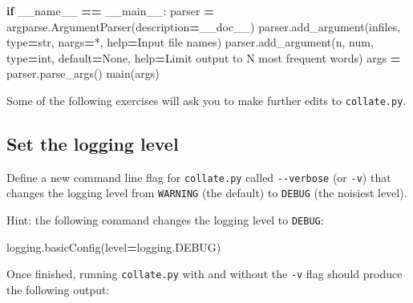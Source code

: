\documentclass[
]{krantz}
\makeatletter
\newenvironment{Shaded}{\begin{snugshade}}{\end{snugshade}}
\newcommand{\BuiltInTok}[1]{#1}
\newcommand{\ControlFlowTok}[1]{\textcolor[rgb]{0.13,0.29,0.53}{\textbf{#1}}}
\newcommand{\NormalTok}[1]{#1}
\newcommand{\OperatorTok}[1]{\textcolor[rgb]{0.81,0.36,0.00}{\textbf{#1}}}
\newcommand{\StringTok}[1]{\textcolor[rgb]{0.31,0.60,0.02}{#1}}
\newcommand{\VariableTok}[1]{\textcolor[rgb]{0.00,0.00,0.00}{#1}}
\newenvironment{kframe}{%
\medskip{}
\setlength{\fboxsep}{.8em}
 \def\at@end@of@kframe{}%
 \ifinner\ifhmode%
  \def\at@end@of@kframe{\end{minipage}}%
  \begin{minipage}{\columnwidth}%
 \fi\fi%
 \def\FrameCommand##1{\hskip\@totalleftmargin \hskip-\fboxsep
 \colorbox{shadecolor}{##1}\hskip-\fboxsep
     \hskip-\linewidth \hskip-\@totalleftmargin \hskip\columnwidth}%
 \MakeFramed {\advance\hsize-\width
   \@totalleftmargin\z@ \linewidth\hsize
   \@setminipage}}%
 {\par\unskip\endMakeFramed%
 \at@end@of@kframe}
\renewenvironment{Shaded}{\begin{kframe}}{\end{kframe}}
\makeatother
\begin{document}
\begin{Shaded}
\begin{Highlighting}[]
\ControlFlowTok{if} \VariableTok{\_\_name\_\_} \OperatorTok{==} \StringTok{\textquotesingle{}\_\_main\_\_\textquotesingle{}}\NormalTok{:}
\NormalTok{    parser }\OperatorTok{=}\NormalTok{ argparse.ArgumentParser(description}\OperatorTok{=}\NormalTok{\_\_doc\_\_)}
\NormalTok{    parser.add\_argument(}\StringTok{\textquotesingle{}infiles\textquotesingle{}}\NormalTok{, }\BuiltInTok{type}\OperatorTok{=}\BuiltInTok{str}\NormalTok{, nargs}\OperatorTok{=}\StringTok{\textquotesingle{}*\textquotesingle{}}\NormalTok{, }\BuiltInTok{help}\OperatorTok{=}\StringTok{\textquotesingle{}Input file names\textquotesingle{}}\NormalTok{)}
\NormalTok{    parser.add\_argument(}\StringTok{\textquotesingle{}{-}n\textquotesingle{}}\NormalTok{, }\StringTok{\textquotesingle{}{-}{-}num\textquotesingle{}}\NormalTok{, }\BuiltInTok{type}\OperatorTok{=}\BuiltInTok{int}\NormalTok{, default}\OperatorTok{=}\VariableTok{None}\NormalTok{,}
                        \BuiltInTok{help}\OperatorTok{=}\StringTok{\textquotesingle{}Limit output to N most frequent words\textquotesingle{}}\NormalTok{)}
\NormalTok{    args }\OperatorTok{=}\NormalTok{ parser.parse\_args()}
\NormalTok{    main(args)}
\end{Highlighting}
\end{Shaded}

Some of the following exercises will ask you to make further edits to \texttt{collate.py}.

\hypertarget{errors-ex-set-level}{%
\subsection{Set the logging level}\label{errors-ex-set-level}}

Define a new command line flag for \texttt{collate.py} called \texttt{-\/-verbose} (or \texttt{-v})
that changes the logging level from \texttt{WARNING} (the default)
to \texttt{DEBUG} (the noisiest level).

Hint: the following command changes the logging level to \texttt{DEBUG}:

\begin{Shaded}
\begin{Highlighting}[]
\NormalTok{logging.basicConfig(level}\OperatorTok{=}\NormalTok{logging.DEBUG)}
\end{Highlighting}
\end{Shaded}

Once finished,
running \texttt{collate.py} with and without the \texttt{-v} flag should produce the following output:
\end{document}
